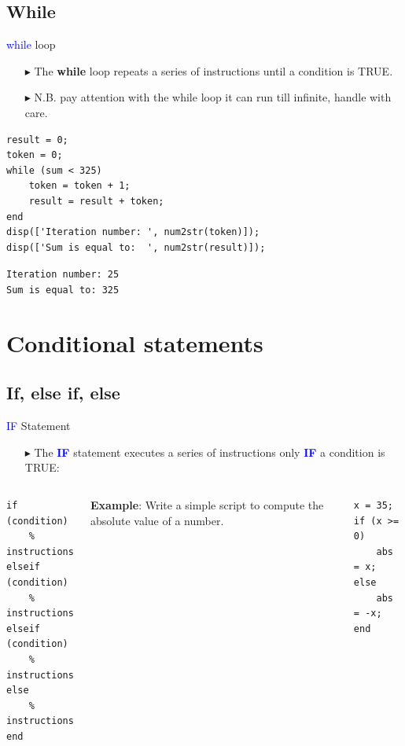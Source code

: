\documentclass[aspectratio=169]{beamer}
\begin{document}
\subsection{While}
\begin{frame}[fragile]{\textcolor{blue}{while} loop}
    \begin{itemize}
        \item[$\blacktriangleright$]
        The \textbf{while} loop repeats a series of instructions \alert{until a condition is TRUE}.

        \item[$\blacktriangleright$]
        N.B. pay attention with the while loop it can run till infinite, \alert{handle with care}.
    \end{itemize}
    \begin{verbatim}
result = 0;
token = 0;
while (sum < 325)
    token = token + 1;
    result = result + token;
end
disp(['Iteration number: ', num2str(token)]);
disp(['Sum is equal to:  ', num2str(result)]);
    \end{verbatim}
    \texttt{Iteration number: 25} \\
    \texttt{Sum is equal to: 325}
\end{frame}

\section{Conditional statements}
\subsection{If, else if, else}
\begin{frame}[fragile]{\textcolor{blue}{IF} Statement}
    \begin{itemize}
        \item[$\blacktriangleright$]
        The \textcolor{blue}{\textbf{IF}} statement executes a series of instructions only \textcolor{blue}{\textbf{IF}} a condition is TRUE:
    \end{itemize}

    \vspace{1.cm}
    \begin{columns}
        \begin{verbatim}
if (condition)
    % instructions
elseif (condition)
    % instructions
elseif (condition)
    % instructions
else
    % instructions
end
        \end{verbatim}
        \textcolor{NavyBlue}{\textbf{Example}: Write a simple script to compute the absolute value of a number.}
        \vspace{0.01cm}
        \begin{verbatim}
x = 35;
if (x >= 0)
    abs = x;
else
    abs = -x;
end
        \end{verbatim}
    \end{columns}
\end{frame}
\end{document}
